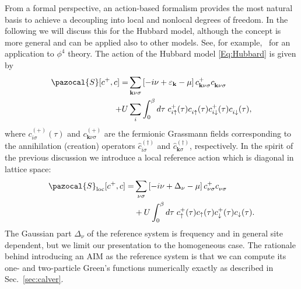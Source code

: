 \documentclass[rmp,aps,reprint,amsmath,amssymb,superscriptaddress,showpacs,nofootinbib]{revtex4-1}
\newcommand{\kv}{\ensuremath{\mathbf{k}}}
\begin{document}
From a formal perspective, an action-based formalism provides the most natural basis to achieve  a decoupling into local and nonlocal degrees of freedom. In the following we will discuss this for the Hubbard model, although the concept is more general and can be applied also to other models. See, for example,~ for an application to $\phi^{4}$ theory. The action of the Hubbard model \eqref{Eq:Hubbard} is given by
\begin{align}
\label{equ:actionhubbard}
 \pazocal{S}[c^+,c]=&\sum_{\mathbf{k}\nu\sigma}\left[-i\nu+\varepsilon_{\mathbf{k}}-\mu\right]c^+_{\mathbf{k}\nu\sigma}c^{\phantom +}_{\mathbf{k}\nu\sigma}\nonumber \\ +U&\sum_i\int_0^{\beta}d\tau\;c^+_{i\uparrow}(\tau)c^{\phantom +}_{i\uparrow}(\tau)c^+_{i\downarrow}(\tau)c^{\phantom +}_{i\downarrow}(\tau),
\end{align}
where $c^{(+)}_{i\sigma}(\tau)$ and $c^{(+)}_{\kv\nu\sigma}$ are the fermionic Grassmann fields corresponding to the annihilation (creation) operators $\hat{c}^{(\dagger)}_{i\sigma}$ and $\hat{c}^{(\dagger)}_{\mathbf{k}\sigma}$, respectively. In the spirit of the previous discussion we introduce a local reference action which is diagonal in lattice space:
\begin{align}
\label{equ:actionref}
 \pazocal{S}_{\text{loc}}[c^+,c]=&\sum_{\nu\sigma}\left[-i\nu+\Delta_{\nu}-\mu\right]c^+_{\nu\sigma}c^{\phantom +}_{\nu\sigma}\nonumber\\&+U\int_0^{\beta}d\tau\;c^+_{\uparrow}(\tau)c_{\uparrow}(\tau)c^+_{\downarrow}(\tau)c_{\downarrow}(\tau).
\end{align}
The Gaussian part $\Delta_{\nu}$ of the reference system is frequency and in general site dependent, but we limit our presentation to the homogeneous case. The rationale behind introducing an AIM as the reference system is that we can compute its one- and two-particle Green's functions numerically exactly as described in Sec.~\ref{sec:calver}.
\end{document}
